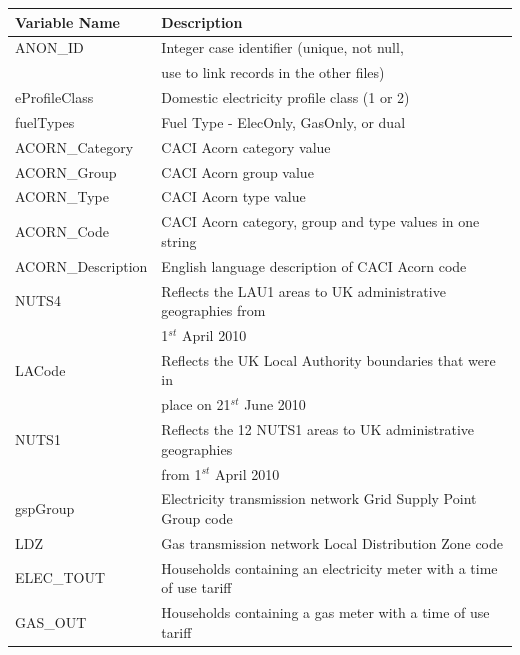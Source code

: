         \begin{center}
            \begin{tabular}{|l |l|}
            \hline
             \textbf{Variable Name} & \textbf{Description} \\
             \hline\hline
             ANON\_ID & Integer case identifier (unique, not null, \\& use to link records in the other files) \\ 
             \hline
             eProfileClass & Domestic electricity profile class (1 or 2) \\
             \hline
             fuelTypes & Fuel Type - ElecOnly, GasOnly, or dual \\
             \hline
             ACORN\_Category & CACI Acorn category value \\
             \hline
             ACORN\_Group & CACI Acorn group value \\
             \hline
             ACORN\_Type & CACI Acorn type value \\
             \hline
             ACORN\_Code & CACI Acorn category, group and type values in one string \\
             \hline
             ACORN\_Description & English language description of CACI Acorn code \\
             \hline
             NUTS4 & Reflects the LAU1 areas to UK administrative geographies from \\& 1$^{st}$ April 2010 \\
             \hline
             LACode & Reflects the UK Local Authority  boundaries that were in \\& place on 21$^{st}$ June 2010\\
             \hline
             NUTS1 & Reflects the 12 NUTS1 areas to UK administrative geographies \\& from 1$^{st}$ April 2010\\
             \hline
             gspGroup & Electricity transmission network Grid Supply Point Group code\\
             \hline
             LDZ & Gas transmission network Local Distribution Zone code\\
             \hline
             ELEC\_TOUT & Households containing an electricity meter with a time of use tariff\\
             \hline
             GAS\_OUT & Households containing a gas meter with a time of use tariff\\
             \hline
            \end{tabular}
        \end{center}
        
